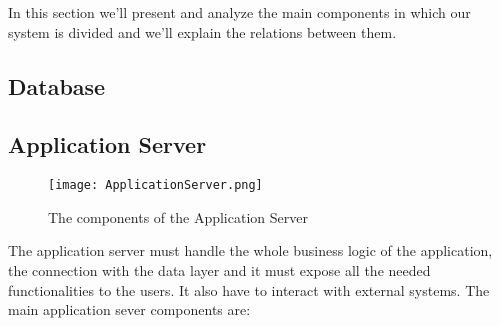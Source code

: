 In this section we'll present and analyze the main components in which our system is divided and we'll explain the relations between them.
\subsection{Database}
\label{subsect:Database}
			
\subsection{Application Server}
\label{subsect:Application Server}
			\begin{figure}[H]
				\begin{center}
					\hspace*{-60pt}
					\texttt{[image: ApplicationServer.png]}
				\end{center}
				\caption{The components of the Application Server}
			\end{figure}
The application server must handle the whole business logic of the application, the connection with the data layer and it must expose all the needed functionalities to the users. It also have to interact with external systems.
The main application sever components are:
